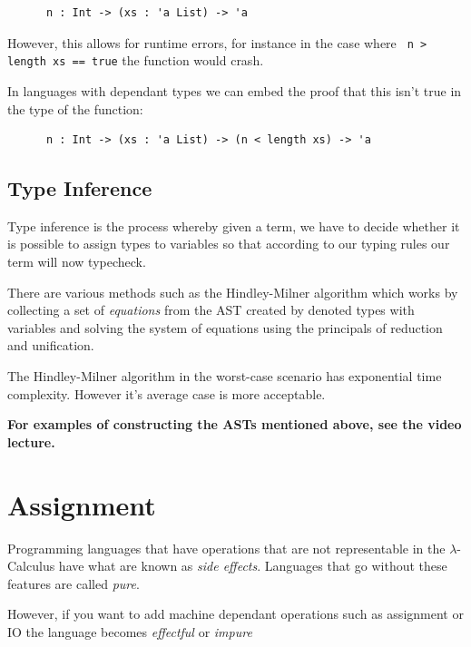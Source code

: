 \documentclass{article}
\renewcommand{\i}[1]{\textit{#1}}
\begin{document}
\begin{center}
   \begin{verbatim}
      n : Int -> (xs : 'a List) -> 'a
   \end{verbatim} 
\end{center}
However, this allows for runtime errors, for instance in the case where \texttt{ n > length xs == true} the function would crash.

In languages with dependant types we can embed the proof that this isn't true in the type of the function: 

\begin{center}
   \begin{verbatim}
      n : Int -> (xs : 'a List) -> (n < length xs) -> 'a
   \end{verbatim} 
\end{center}

\subsection{Type Inference}

Type inference is the process whereby given a term, we have to decide whether it is possible to assign types to variables so that according to our typing rules our term will now typecheck.

There are various methods such as the Hindley-Milner algorithm which works by collecting a set of \i{equations} from the AST created by denoted types with variables and solving the system of equations using the principals of reduction and unification. 

The Hindley-Milner algorithm in the worst-case scenario has exponential time complexity. However it's average case is more acceptable.

\textbf{For examples of constructing the ASTs mentioned above, see the video lecture.}

\section{Assignment}

Programming languages that have operations that are not representable in the $\lambda$-Calculus have what are known as \i{side effects}. Languages that go without these features are called \i{pure}.

However, if you want to add machine dependant operations such as assignment or IO the language becomes \i{effectful} or \i{impure}
\end{document}
